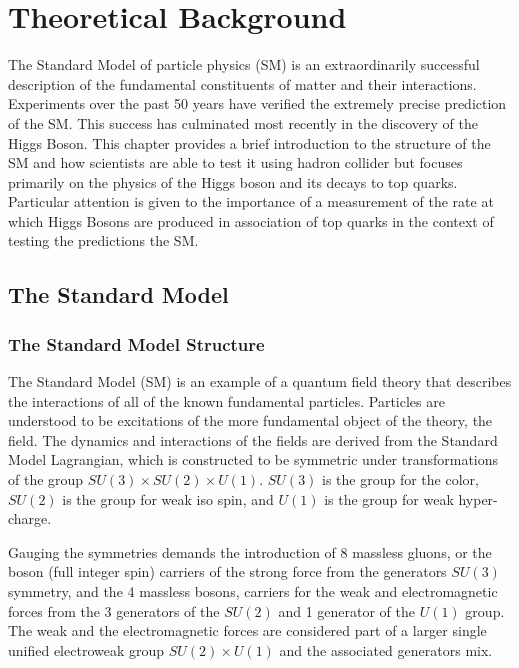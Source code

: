\chapter[Theoretical Background][Theoretical Background]{Theoretical Background}

The Standard Model of particle physics (SM) is an extraordinarily successful
description of the fundamental constituents of matter and their interactions.
Experiments over the past 50 years have verified the extremely precise
prediction of the SM. This success has culminated most recently in the
discovery of the Higgs Boson.  This chapter provides a brief introduction to
the structure of the SM and how scientists are able to test it using hadron
collider but focuses primarily on the physics of the Higgs boson and its decays
to top quarks.  Particular attention is given to the importance of a
measurement of the rate at which Higgs Bosons are produced in association of
top quarks in the context of testing the predictions the SM. 


\section{The Standard Model}
\subsection{The Standard Model Structure}

The Standard Model (SM) \cite{np_22_579, prl_19_1264, 1964.Salam-Ward.gauge-theory,1973.Weinberg.SM-with-QCD} is an example of a quantum field theory that describes
the interactions of all of the known fundamental particles. Particles are understood to be excitations of the more fundamental
object of the theory, the field. The dynamics and interactions of the fields are
derived from the Standard Model Lagrangian, which is constructed to be
symmetric under transformations of the group $SU(3) \times SU(2)
  \times U(1)$. $SU(3)$ is the group for the color, $SU(2)$ is the group 
for weak iso spin, and $U(1)$ is the group for weak hyper-charge.

Gauging the symmetries demands the introduction of 8 massless gluons, or the
boson (full integer spin) carriers of the strong force \cite{1973.Gross-Wilczek.Asymptotic_freedom_0} from the generators
$SU(3)$ symmetry, and the 4 massless bosons, carriers for the weak
and electromagnetic forces from the 3 generators of the $SU(2)$ and 1
generator of the $U(1)$ group. The weak and the electromagnetic forces are considered part of a larger single 
unified electroweak group $SU(2) \times U(1)$ and the associated generators mix. 

